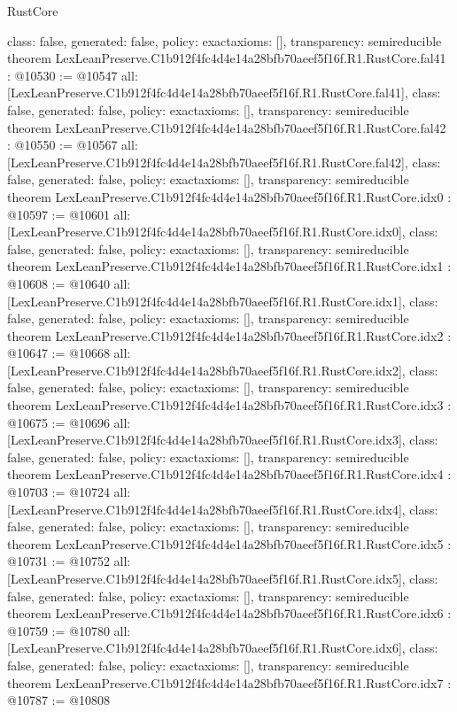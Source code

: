 \begin{lexlean}{RustCore}
\begin{coremodule}
{  class: false,
  generated: false,
  policy: exact{axioms: []},
  transparency: semireducible
}
theorem LexLeanPreserve.C1b912f4fc4d4e14a28bfb70aeef5f16f.R1.RustCore.fal41 : @10530 := @10547 {
  all: [LexLeanPreserve.C1b912f4fc4d4e14a28bfb70aeef5f16f.R1.RustCore.fal41],
  class: false,
  generated: false,
  policy: exact{axioms: []},
  transparency: semireducible
}
theorem LexLeanPreserve.C1b912f4fc4d4e14a28bfb70aeef5f16f.R1.RustCore.fal42 : @10550 := @10567 {
  all: [LexLeanPreserve.C1b912f4fc4d4e14a28bfb70aeef5f16f.R1.RustCore.fal42],
  class: false,
  generated: false,
  policy: exact{axioms: []},
  transparency: semireducible
}
theorem LexLeanPreserve.C1b912f4fc4d4e14a28bfb70aeef5f16f.R1.RustCore.idx0 : @10597 := @10601 {
  all: [LexLeanPreserve.C1b912f4fc4d4e14a28bfb70aeef5f16f.R1.RustCore.idx0],
  class: false,
  generated: false,
  policy: exact{axioms: []},
  transparency: semireducible
}
theorem LexLeanPreserve.C1b912f4fc4d4e14a28bfb70aeef5f16f.R1.RustCore.idx1 : @10608 := @10640 {
  all: [LexLeanPreserve.C1b912f4fc4d4e14a28bfb70aeef5f16f.R1.RustCore.idx1],
  class: false,
  generated: false,
  policy: exact{axioms: []},
  transparency: semireducible
}
theorem LexLeanPreserve.C1b912f4fc4d4e14a28bfb70aeef5f16f.R1.RustCore.idx2 : @10647 := @10668 {
  all: [LexLeanPreserve.C1b912f4fc4d4e14a28bfb70aeef5f16f.R1.RustCore.idx2],
  class: false,
  generated: false,
  policy: exact{axioms: []},
  transparency: semireducible
}
theorem LexLeanPreserve.C1b912f4fc4d4e14a28bfb70aeef5f16f.R1.RustCore.idx3 : @10675 := @10696 {
  all: [LexLeanPreserve.C1b912f4fc4d4e14a28bfb70aeef5f16f.R1.RustCore.idx3],
  class: false,
  generated: false,
  policy: exact{axioms: []},
  transparency: semireducible
}
theorem LexLeanPreserve.C1b912f4fc4d4e14a28bfb70aeef5f16f.R1.RustCore.idx4 : @10703 := @10724 {
  all: [LexLeanPreserve.C1b912f4fc4d4e14a28bfb70aeef5f16f.R1.RustCore.idx4],
  class: false,
  generated: false,
  policy: exact{axioms: []},
  transparency: semireducible
}
theorem LexLeanPreserve.C1b912f4fc4d4e14a28bfb70aeef5f16f.R1.RustCore.idx5 : @10731 := @10752 {
  all: [LexLeanPreserve.C1b912f4fc4d4e14a28bfb70aeef5f16f.R1.RustCore.idx5],
  class: false,
  generated: false,
  policy: exact{axioms: []},
  transparency: semireducible
}
theorem LexLeanPreserve.C1b912f4fc4d4e14a28bfb70aeef5f16f.R1.RustCore.idx6 : @10759 := @10780 {
  all: [LexLeanPreserve.C1b912f4fc4d4e14a28bfb70aeef5f16f.R1.RustCore.idx6],
  class: false,
  generated: false,
  policy: exact{axioms: []},
  transparency: semireducible
}
theorem LexLeanPreserve.C1b912f4fc4d4e14a28bfb70aeef5f16f.R1.RustCore.idx7 : @10787 := @10808 {
}
\end{coremodule}
\end{lexlean}
